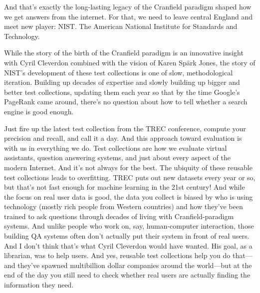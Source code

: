 And that's exactly the long-lasting legacy of the Cranfield paradigm shaped
 how we get answers from the internet.
 For that, we need to leave central England and meet new player: NIST.  The
 American National Institute for Standards and Technology.

While the story of the birth of the Cranfield paradigm is an innovative
insight with Cyril Cleverdon combined with the vision of Karen Spärk Jones,
the story of NIST’s development of these test collections is one of slow,
methodological iteration.  Building up decades of expertise and slowly
building up bigger and better test collections, updating them each year so
that by the time Google’s PageRank came around, there’s no question about how
to tell whether a search engine is good enough.

Just fire up the latest test collection from the TREC conference, compute your precision and recall, and call it a day.
%
And this approach toward evaluation is with us in everything we do.  Test
collections are how we evaluate virtual assistants, question answering
systems, and just about every aspect of the modern Internet.  And it’s not
always for the best.  The ubiquity of these reusable test collections leads to
overfitting.  TREC puts out new datasets every year or so, but that’s not fast
enough for machine learning in the 21st century!  And while the focus on real
user data is good, the data you collect is biased by who is using technology
(mostly rich people from Western countries) and how they’ve been trained to
ask questions through decades of living with Cranfield-paradigm systems.  And
unlike people who work on, say, human-computer interaction, those building QA
systems often don’t actually put their system in front of real users.  And I
don’t think that’s what Cyril Cleverdon would have wanted.  His goal, as a
librarian, was to help users.  And yes, reusable test collections help you do
that—and they’ve spawned multibillion dollar companies around the world—but at
the end of the day you still need to check whether real users are actually
finding the information they need.


